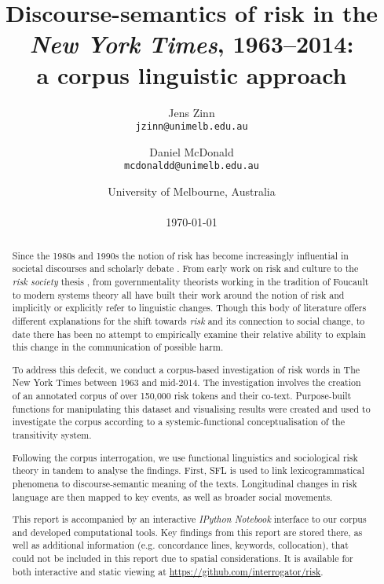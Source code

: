 \documentclass{report}
\title{Discourse-semantics of risk in the \emph{New York Times}, 1963--2014: \\ a corpus linguistic approach}
\author{
	Jens Zinn\\
	\texttt{jzinn@unimelb.edu.au}
	\and
	Daniel McDonald\\
	\texttt{mcdonaldd@unimelb.edu.au}\\
	}
\date{University of Melbourne, Australia\\
	~\\
	\today}
\begin{document}
		

	\renewcommand{\abstractname}{Abstract}

	\maketitle

\begin{abstract}

    Since the 1980s and 1990s the notion of risk has become increasingly influential in societal discourses and scholarly debate \cite{skolbekken_risk_1995}. From early work on risk and culture \cite{douglas_risk_1986,douglas_risk_2013} to the \emph{risk society} thesis \cite{beck_risk_1992,beck_world_2009,giddens_runaway_2002}, from governmentality theorists working in the tradition of Foucault \cite{dean_governmentality:_2010,omalley_risk_2012,rose_powers_1999} to modern systems theory \cite{luhmann_ecological_1989,luhmann_communication_1993} all have built their work around the notion of risk and implicitly or explicitly refer to linguistic changes. Though this body of literature offers different explanations for the shift towards \emph{risk} and its connection to social change, to date there has been no attempt to empirically examine their relative ability to explain this change in the communication of possible harm. 


	To address this defecit, we conduct a corpus-based investigation of risk words in The New York Times between 1963 and mid-2014. The investigation involves the creation of an annotated corpus of over 150,000 risk tokens and their co-text. Purpose-built functions for manipulating this dataset and visualising results were created and used to investigate the corpus according to a systemic-functional conceptualisation of the transitivity system.

    Following the corpus interrogation, we use functional linguistics and sociological risk theory in tandem to analyse the findings. First, SFL is used to link lexicogrammatical phenomena to discourse-semantic meaning of the texts. Longitudinal changes in risk language are then mapped to key events, as well as broader social movements.

    This report is accompanied by an interactive \emph{IPython Notebook} interface to our corpus and developed computational tools. Key findings from this report are stored there, as well as additional information (e.g. concordance lines, keywords, collocation), that could not be included in this report due to spatial considerations. It is available for both interactive and static viewing at \url{https://github.com/interrogator/risk}.

	\end{abstract}
\end{document}
